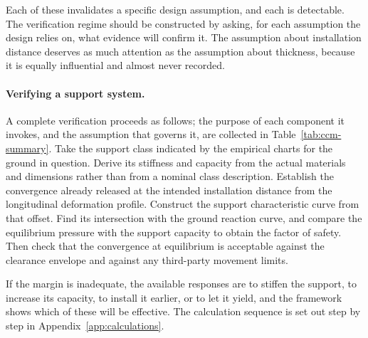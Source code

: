 Each of these invalidates a specific design assumption, and each is detectable.
The verification regime should be constructed by asking, for each assumption
the design relies on, what evidence will confirm it. The assumption
about installation distance deserves as much attention as the assumption about
thickness, because it is equally influential and almost never recorded.

\paragraph{Verifying a support system.}
A complete verification proceeds as follows; the purpose of each component it
invokes, and the assumption that governs it, are collected in
Table~\ref{tab:ccm-summary}. Take the support class indicated by the empirical
charts for the ground in question. Derive its stiffness and
capacity from the actual materials and dimensions rather than from a nominal
class description. Establish the convergence already released at the intended
installation distance from the longitudinal deformation profile. Construct the
support characteristic curve from that offset. Find its intersection with the
ground reaction curve, and compare the equilibrium pressure with the support
capacity to obtain the factor of safety. Then check that the convergence at
equilibrium is acceptable against the clearance envelope and against any
third-party movement limits.

If the margin is inadequate, the available responses are to stiffen the
support, to increase its capacity, to install it earlier, or to let it yield,
and the framework shows which of these will be effective. The calculation sequence is set out step by step in
Appendix~\ref{app:calculations}.

\chapterreferences
